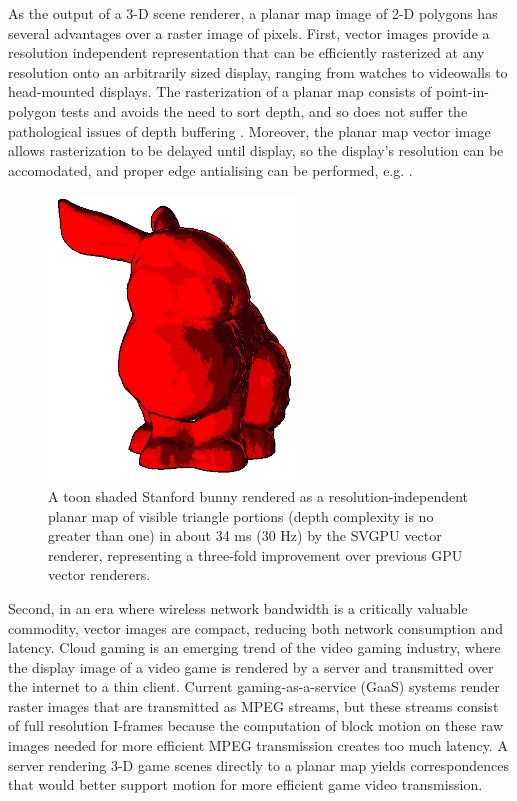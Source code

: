 \documentclass[review]{acmsiggraph}
\begin{document}
As the output of a 3-D scene renderer, a planar map image of 2-D polygons has
several advantages over a raster image of pixels. First, vector images provide
a resolution independent representation that can be efficiently rasterized at
any resolution onto an arbitrarily sized display, ranging from watches to
videowalls to head-mounted displays. The rasterization of a planar map consists
of point-in-polygon
tests and avoids the need to sort depth, and so does not suffer the
pathological issues of depth buffering \cite{wmap,etc}. Moreover, the planar
map vector image allows rasterization to be delayed until display, so the
display's resolution can be accomodated, and proper edge antialising can be
performed, e.g. \cite{manson2011}.

\begin{figure}[t] \centering
\includegraphics[height=3in]{images/bunny-red.png}
\caption{A toon shaded Stanford bunny rendered as a resolution-independent
planar map of visible triangle portions (depth complexity is no greater than
one) in about 34 ms (30 Hz) by the SVGPU vector renderer, representing a
three-fold improvement over previous GPU vector renderers.}
\end{figure}

Second, in an era where wireless network bandwidth is a critically
valuable commodity, vector images are compact, reducing both network
consumption and latency. Cloud gaming is an emerging trend of the video gaming
industry, where the display image of a video game is rendered by a server and
transmitted over the internet to a thin client. Current gaming-as-a-service
(GaaS) systems render raster images that are transmitted as MPEG streams, but
these streams consist of full resolution I-frames because the computation of
block motion on these raw images needed for more efficient MPEG transmission
creates too much latency. A server rendering 3-D game scenes directly to a
planar map yields correspondences that would better support motion for more
efficient game video transmission.
\end{document}
